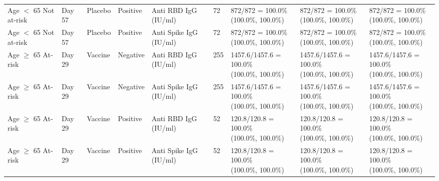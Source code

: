 \documentclass[]{book}
\theoremstyle{definition}
\theoremstyle{definition}
\theoremstyle{definition}
\newcommand{\1}{\mathbbm{1}}
\begin{document}
\begin{landscape}
\begin{ThreePartTable}
\begin{longtable}[t]{>{\raggedright\arraybackslash}p{2.7cm}llllllll}
\hspace{1em}Age $<$ 65 Not at-risk & Day 57 & Placebo & Positive & Anti RBD IgG (IU/ml) & 72 & \makecell[l]{872/872 = 100.0\%\\(100.0\%, 100.0\%)} & \makecell[l]{872/872 = 100.0\%\\(100.0\%, 100.0\%)} & \makecell[l]{872/872 = 100.0\%\\(100.0\%, 100.0\%)}\\
\hspace{1em}Age $<$ 65 Not at-risk & Day 57 & Placebo & Positive & Anti Spike IgG (IU/ml) & 72 & \makecell[l]{872/872 = 100.0\%\\(100.0\%, 100.0\%)} & \makecell[l]{872/872 = 100.0\%\\(100.0\%, 100.0\%)} & \makecell[l]{872/872 = 100.0\%\\(100.0\%, 100.0\%)}\\
\hspace{1em}Age $\geq$ 65 At-risk & Day 29 & Vaccine & Negative & Anti RBD IgG (IU/ml) & 255 & \makecell[l]{1457.6/1457.6 = 100.0\%\\(100.0\%, 100.0\%)} & \makecell[l]{1457.6/1457.6 = 100.0\%\\(100.0\%, 100.0\%)} & \makecell[l]{1457.6/1457.6 = 100.0\%\\(100.0\%, 100.0\%)}\\
\hspace{1em}Age $\geq$ 65 At-risk & Day 29 & Vaccine & Negative & Anti Spike IgG (IU/ml) & 255 & \makecell[l]{1457.6/1457.6 = 100.0\%\\(100.0\%, 100.0\%)} & \makecell[l]{1457.6/1457.6 = 100.0\%\\(100.0\%, 100.0\%)} & \makecell[l]{1457.6/1457.6 = 100.0\%\\(100.0\%, 100.0\%)}\\
\hspace{1em}Age $\geq$ 65 At-risk & Day 29 & Vaccine & Positive & Anti RBD IgG (IU/ml) & 52 & \makecell[l]{120.8/120.8 = 100.0\%\\(100.0\%, 100.0\%)} & \makecell[l]{120.8/120.8 = 100.0\%\\(100.0\%, 100.0\%)} & \makecell[l]{120.8/120.8 = 100.0\%\\(100.0\%, 100.0\%)}\\
\hspace{1em}Age $\geq$ 65 At-risk & Day 29 & Vaccine & Positive & Anti Spike IgG (IU/ml) & 52 & \makecell[l]{120.8/120.8 = 100.0\%\\(100.0\%, 100.0\%)} & \makecell[l]{120.8/120.8 = 100.0\%\\(100.0\%, 100.0\%)} & \makecell[l]{120.8/120.8 = 100.0\%\\(100.0\%, 100.0\%)}\\

\end{longtable}
\end{ThreePartTable}
\end{landscape}
\end{document}
